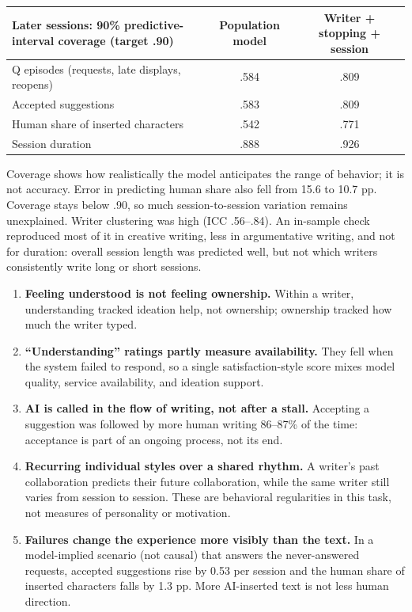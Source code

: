 \documentclass[10pt]{article}
\newcommand{\head}[1]{\par\medskip\noindent{\large\bfseries #1}\par\smallskip}
\begin{document}
\begin{center}\small
\begin{tabular}{lcc}
\toprule
Later sessions: 90\% predictive-interval coverage (target .90) & Population model & Writer + stopping + session \\
\midrule
Q episodes (requests, late displays, reopens) & .584 & .809 \\
Accepted suggestions & .583 & .809 \\
Human share of inserted characters & .542 & .771 \\
Session duration & .888 & .926 \\
\bottomrule
\end{tabular}
\end{center}
Coverage shows how realistically the model anticipates the range of behavior; it is not accuracy.
Error in predicting human share also fell from 15.6 to 10.7 pp. Coverage stays below .90, so much session-to-session variation remains unexplained.
Writer clustering was high (ICC .56--.84). An in-sample check reproduced most of it in creative writing, less in argumentative writing,
and not for duration: overall session length was predicted well, but not which writers consistently write long or short sessions.

\head{(5) Findings}
\begin{enumerate}
  \item \textbf{Feeling understood is not feeling ownership.} Within a writer, understanding tracked ideation help, not ownership; ownership tracked how much the writer typed.
  \item \textbf{``Understanding'' ratings partly measure availability.} They fell when the system failed to respond, so a single satisfaction-style score mixes model quality, service availability, and ideation support.
  \item \textbf{AI is called in the flow of writing, not after a stall.} Accepting a suggestion was followed by more human writing 86--87\% of the time: acceptance is part of an ongoing process, not its end.
  \item \textbf{Recurring individual styles over a shared rhythm.} A writer's past collaboration predicts their future collaboration, while the same writer still varies from session to session. These are behavioral regularities in this task, not measures of personality or motivation.
  \item \textbf{Failures change the experience more visibly than the text.} In a model-implied scenario (not causal) that answers the never-answered requests, accepted suggestions rise by 0.53 per session and the human share of inserted characters falls by 1.3 pp. More AI-inserted text is not less human direction.
\end{enumerate}
\end{document}
